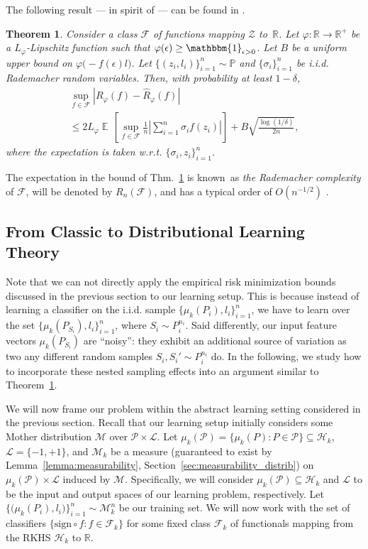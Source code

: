 \documentclass{article}
\newtheorem{theorem}{Theorem}
\DeclareMathOperator*{\E}{\mathbb{E}\,}
\renewcommand{\P}{\mathcal{P}}
\renewcommand{\H}{\mathcal{H}}
\newcommand{\F}{\mathcal{F}}
\newcommand{\M}{\mathscr{M}}
\newcommand{\Z}{\mathcal{Z}}
\newcommand{\sig}{\mathrm{sign}\circ\!}
\newcommand{\Pio}{\mathbb{P}}
\newcommand{\R}{\mathbb{R}}
\renewcommand{\L}{\mathcal{L}}
\newcommand{\Rp}{R_{\varphi}}
\newcommand{\Rpn}{\hat{R}_{\varphi}}
\newcommand{\muP}{\mu_k(\P)}
\begin{document}
The following result --- in spirit of \citet{KP99,BM01} --- can be found in
\citet[Theorem 4.1]{BBL05}.
\begin{theorem}
\label{thm:classic}
Consider a class $\F$ of functions mapping $\Z$ to~$\R$.  Let $\varphi\colon
\R\to\R^+$ be a $L_\varphi$-Lipschitz function such that $\varphi(\epsilon)
\geq \mathbbm{1}_{\epsilon>0}$.  Let $B$ be a uniform upper bound on
$\varphi\bigl(-f(\epsilon) l\bigr)$.  Let $\{(z_i,l_i)\}_{i=1}^n \sim \Pio$ and
$\{\sigma_i\}_{i=1}^n$ be i.i.d. Rademacher random variables.  Then, with
probability at least $1-\delta$,
\begin{multline*}
\sup_{f\in\F}|\Rp(f) - \Rpn(f)|\\
\leq
2 L_\varphi \E\left[\sup_{f\in \F}\frac{1}{n}\left|\sum_{i=1}^n \sigma_i f(z_i)\right|\right] + B\sqrt{\frac{\log(1/\delta)}{2n}},
\end{multline*}
where the expectation is taken w.r.t. $\{\sigma_i,z_i\}_{i=1}^n$.
\end{theorem}
The expectation in the bound of Thm.~\ref{thm:classic} is known~as \emph{the
Rademacher complexity} of $\F$, will be denoted by $R_n(\F)$, and has a typical
order of $O(n^{-1/2})$ \cite{K11}.

\subsection{From Classic to Distributional Learning Theory}\label{sec:distrib}

Note that we can not directly apply the empirical risk minimization bounds
discussed in the previous section to our learning setup.  This is because
instead of learning a classifier on the i.i.d.  sample
$\{\mu_k(P_i),l_i\}_{i=1}^n$, we have to learn over the set
$\{\mu_k(P_{S_i}),l_i\}_{i=1}^n$, where $S_i \sim P_i^{n_i}$.  Said
differently, our input feature vectors $\mu_k(P_{S_i})$ are ``noisy'': they
exhibit an additional source of variation as two any different random samples
$S_i,S_i'\sim P_i^{n_i}$ do.  In the following, we study how to incorporate
these nested sampling effects into an argument similar to
Theorem~\ref{thm:classic}.

We will now frame our problem within the abstract learning setting considered
in the previous section.  Recall that our learning setup initially considers
some Mother distribution $\M$ over $\P \times \L$.  Let $\mu_k(\P) = \{\mu_k(P)
: P \in \P \} \subseteq \H_k$, $\L = \{-1,+1\}$, and $\M_k$ be a
measure (guaranteed to exist by
Lemma~\ref{lemma:measurability}, 
Section~\ref{sec:measurability_distrib}) on $\mu_k(\P)
\times \L$ induced by $\M$.  Specifically, we will consider $\muP\subseteq
\H_k$ and $\L$ to be the input and output spaces of our learning problem,
respectively.  Let $\bigl\{\bigl(\mu_k(P_i),l_i\bigr)\bigr\}_{i=1}^n\sim
\M_k^n$ be our training set.  We will now work with the set of classifiers
$\{\sig f\colon f\in \F_k\}$ for some fixed class $\F_k$ of functionals mapping
from the RKHS $\H_k$ to $\R$.
\end{document}
